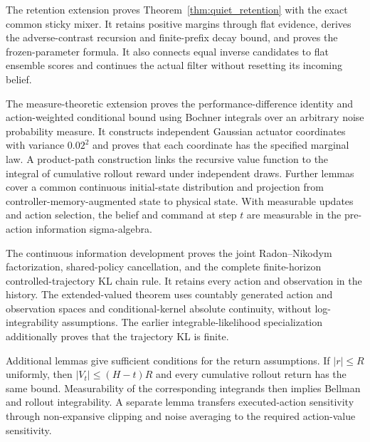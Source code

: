 The retention extension proves Theorem~\ref{thm:quiet_retention} with the exact common sticky mixer.
It retains positive margins through flat evidence, derives the adverse-contrast recursion and finite-prefix decay bound, and proves the frozen-parameter formula.
It also connects equal inverse candidates to flat ensemble scores and continues the actual filter without resetting its incoming belief.

The measure-theoretic extension proves the performance-difference identity and action-weighted conditional bound using Bochner integrals over an arbitrary noise probability measure. It constructs independent Gaussian actuator coordinates with variance $0.02^2$ and proves that each coordinate has the specified marginal law. A product-path construction links the recursive value function to the integral of cumulative rollout reward under independent draws. Further lemmas cover a common continuous initial-state distribution and projection from controller-memory-augmented state to physical state. With measurable updates and action selection, the belief and command at step $t$ are measurable in the pre-action information sigma-algebra.

The continuous information development proves the joint Radon--Nikodym factorization, shared-policy cancellation, and the complete finite-horizon controlled-trajectory KL chain rule. It retains every action and observation in the history. The extended-valued theorem uses countably generated action and observation spaces and conditional-kernel absolute continuity, without log-integrability assumptions. The earlier integrable-likelihood specialization additionally proves that the trajectory KL is finite.

Additional lemmas give sufficient conditions for the return assumptions. If $|r|\le R$ uniformly, then $|V_t|\le(H-t)R$ and every cumulative rollout return has the same bound. Measurability of the corresponding integrands then implies Bellman and rollout integrability. A separate lemma transfers executed-action sensitivity through non-expansive clipping and noise averaging to the required action-value sensitivity.

